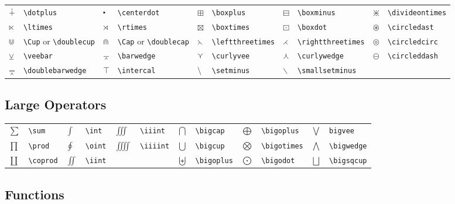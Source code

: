 \documentclass[10pt, english]{article}
\begin{document}
	\begin{center}
		\scriptsize
	\begin{tabular}{ll|ll|ll|ll|ll}
		$\dotplus$ & \verb|\dotplus| & $\centerdot$ & \verb|\centerdot| & $\boxplus$ & \verb|\boxplus| & $\boxminus$ & \verb|\boxminus| & $\divideontimes$ & \verb|\divideontimes| \\
		$\ltimes$ & \verb|\ltimes| & $\rtimes$ & \verb|\rtimes| & $\boxtimes$ & \verb|\boxtimes| & $\boxdot$ & \verb|\boxdot| & $\circledast$ & \verb|\circledast| \\
		$\Cup$ & \verb|\Cup| or \verb|\doublecup| & $\Cap$ & \verb|\Cap| or \verb|\doublecap| & $\leftthreetimes$ & \verb|\leftthreetimes| & $\rightthreetimes$ & \verb|\rightthreetimes| & $\circledcirc$ & \verb|\circledcirc| \\
		$\veebar$ & \verb|\veebar| & $\barwedge$ & \verb|\barwedge| & $\curlyvee$ & \verb|\curlyvee| & $\curlywedge$ & \verb|\curlywedge| & $\circleddash$ & \verb|\circleddash| \\
		$\doublebarwedge$ & \verb|\doublebarwedge| & $\intercal$ & \verb|\intercal| & $\setminus$ & \verb|\setminus| & $\smallsetminus$ & \verb|\smallsetminus|\\
	\end{tabular}
	\end{center}

	\subsection{Large Operators}

	\begin{center}
		\scriptsize
	\begin{tabular}{ll|ll|ll|ll|ll|ll}
		$\sum$ & \verb|\sum| & $\int$ & \verb|\int| & $\iiint$ & \verb|\iiint| & $\bigcap$ & \verb|\bigcap| & $\bigoplus$ & \verb|\bigoplus| & $\bigvee$ & \verb|bigvee|\\
		$\prod$ & \verb|\prod| & $\oint$ & \verb|\oint| & $\iiiint$ & \verb|\iiiint| & $\bigcup$ & \verb|\bigcup| & $\bigotimes$ & \verb|\bigotimes| & $\bigwedge$ & \verb|\bigwedge|\\
		$\coprod$ & \verb|\coprod| & $\iint$ & \verb|\iint| & & & $\biguplus$ & \verb|\bigoplus| & $\bigodot$ & \verb|\bigodot| & $\bigsqcup$ & \verb|\bigsqcup|\\
	\end{tabular}
	\end{center}

	\subsection{Functions}
\end{document}
